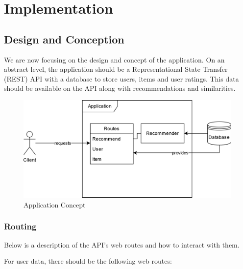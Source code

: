 \chapter{Implementation}

\label{chap:impl}

\section{Design and Conception}

\label{sec:design_concept}

We are now focusing on the design and concept of the application. On an abstract level, the application should be a Representational State Transfer (REST) API with a database to store users, items and user ratings. This data should be available on the API along with recommendations and similarities.

\begin{figure}[h]
\centering
\includegraphics[width=\textwidth]{images/BPMN_design}
\caption{\label{fig:design}Application Concept}
\end{figure}

\subsection{Routing}

Below is a description of the API's web routes and how to interact with them.

For user data, there should be the following web routes:

